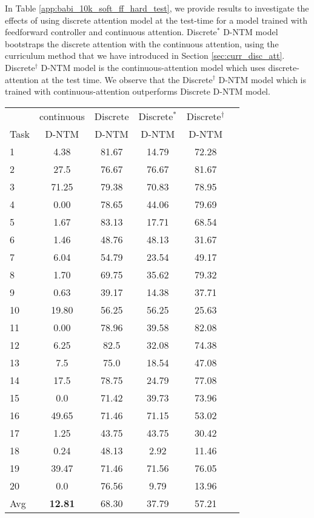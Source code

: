 \documentclass[12pt]{article}
\begin{document}
In Table \ref{app:babi_10k_soft_ff_hard_test}, we provide results to investigate the effects of using discrete attention model at the test-time for a model trained with feedforward controller and continuous attention. Discrete$^{\ast}$ D-NTM model bootstraps the discrete attention with the continuous attention, using the curriculum method that we have introduced in Section \ref{sec:curr_disc_att}. Discrete$^{\dagger}$ D-NTM model is the continuous-attention model which uses discrete-attention at the test time. We observe that the Discrete$^{\dagger}$ D-NTM model which is trained with continuous-attention outperforms Discrete D-NTM model.

\begin{table*}[htbp]
\vspace{-2mm}
  \centering
  \footnotesize 
\begin{tabular}{ | l || c |c | c | c | c |}
\hline
&  continuous & Discrete & Discrete$^\ast$ & Discrete$^\dagger$  \\
Task & D-NTM & D-NTM  & D-NTM & D-NTM\\ \hline

1 &4.38 & 81.67 & 14.79 & 72.28\\
2 & 27.5 & 76.67 & 76.67 & 81.67 \\
3 & 71.25 & 79.38 & 70.83 & 78.95 \\
4 &0.00 & 78.65 & 44.06 & 79.69 \\
5 &1.67 & 83.13 & 17.71 & 68.54 \\
6 & 1.46 & 48.76 & 48.13 & 31.67 \\
7 & 6.04 & 54.79 & 23.54 & 49.17 \\
8 & 1.70 & 69.75 & 35.62 & 79.32 \\
9 & 0.63 & 39.17 & 14.38 & 37.71 \\
10 & 19.80 & 56.25 & 56.25 & 25.63 \\
11 & 0.00 & 78.96 & 39.58 & 82.08 \\
12 & 6.25 & 82.5 & 32.08 & 74.38 \\
13  & 7.5 & 75.0 & 18.54 & 47.08 \\
14 & 17.5 & 78.75 & 24.79 & 77.08 \\
15 & 0.0 & 71.42 & 39.73 & 73.96 \\
16 & 49.65 & 71.46 & 71.15 & 53.02 \\
17  & 1.25 & 43.75 & 43.75 & 30.42 \\
18 & 0.24 & 48.13 & 2.92 & 11.46\\
19 & 39.47 & 71.46 & 71.56 & 76.05\\
20 & 0.0 & 76.56 & 9.79 & 13.96 \\\hline
Avg & \textbf{12.81} & 68.30 & 37.79 & 57.21 \\\hline


\end{tabular}
\end{table*}
\end{document}
